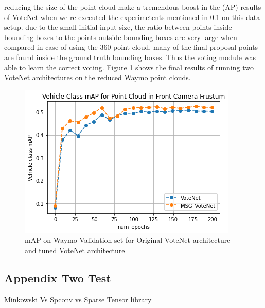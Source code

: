 \documentclass[10pt,twocolumn,letterpaper]{article}
\begin{document}
reducing the size of the point cloud make a tremendous boost in the (AP) results of VoteNet when we re-executed the experimetents mentioned in \ref{} on this data setup. due to the small initial input size, the ratio between points inside bounding boxes to the points outside bounding boxes are very large when compared in case of using the 360 point cloud. many of the final proposal points are found inside the ground truth bounding boxes. Thus the voting module was able to learn the correct voting. Figure \ref{fig:votnet_front_camera_results} shows the final results of running two VoteNet architectures on the reduced Waymo point clouds.

\begin{figure}
	\includegraphics[width=\linewidth]{media/votenet_mAP.png}
   \caption{mAP on Waymo Validation set for Original VoteNet architecture and tuned VoteNet architecture}
\label{fig:votnet_front_camera_results}
\end{figure}


\subsection{Appendix Two Test}

Minkowski Vs Spconv vs Sparse Tensor library
\end{document}
